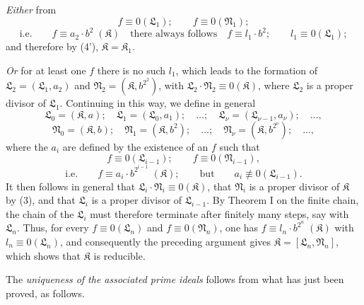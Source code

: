 \documentclass[11pt]{article}
\providecommand{\ideal}[1]{\mathfrak{#1}}
\begin{document}
\emph{Either} from
\[
 f\equiv0(\ideal L_1);\qquad f\equiv0(\ideal N_1);
\]
\[
 \text{i.e.}\qquad f\equiv a_2\cdot b^2\;(\ideal K)
 \quad\text{there always follows}\quad
 f\equiv l_1\cdot b^2;\qquad l_1\equiv0(\ideal L_1);
\]
and therefore by (4'), $\ideal K=\ideal K_1$.

\emph{Or} for at least one $f$ there is no such $l_1$, which leads to the formation of $\ideal L_2=(\ideal L_1,a_2)$ and $\ideal N_2=(\ideal K,b^{2^2})$, with $\ideal L_2\cdot\ideal N_2\equiv0(\ideal K)$, where $\ideal L_2$ is a proper divisor of $\ideal L_1$. Continuing in this way, we define in general
\[
 \ideal L_0=(\ideal K,a);\quad
 \ideal L_1=(\ideal L_0,a_1);\quad\ldots;\quad
 \ideal L_\nu=(\ideal L_{\nu-1},a_\nu);\quad\ldots,
\]
\[
 \ideal N_0=(\ideal K,b);\quad
 \ideal N_1=(\ideal K,b^2);\quad\ldots;\quad
 \ideal N_\nu=(\ideal K,b^{2^\nu});\quad\ldots,
\]
where the $a_i$ are defined by the existence of an $f$ such that
\[
 f\equiv0(\ideal L_{i-1});\qquad f\equiv0(\ideal N_{i-1}),
\]
\[
 \text{i.e.}\qquad f\equiv a_i\cdot b^{2^{i-1}}\;(\ideal K);
 \qquad\text{but}\qquad a_i\not\equiv0(\ideal L_{i-1}).
\]
It then follows in general that $\ideal L_i\cdot\ideal N_i\equiv0(\ideal K)$, that $\ideal N_i$ is a proper divisor of $\ideal K$ by (3), and that $\ideal L_i$ is a proper divisor of $\ideal L_{i-1}$. By Theorem I on the finite chain, the chain of the $\ideal L_i$ must therefore terminate after finitely many steps, say with $\ideal L_n$. Thus, for every $f\equiv0(\ideal L_n)$ and $f\equiv0(\ideal N_n)$, one has $f\equiv l_n\cdot b^{2^n}\;(\ideal K)$ with $l_n\equiv0(\ideal L_n)$, and consequently the preceding argument gives $\ideal K=[\ideal L_n,\ideal N_n]$, which shows that $\ideal K$ is reducible.

The \emph{uniqueness of the associated prime ideals} follows from what has just been proved, as follows.
\end{document}
